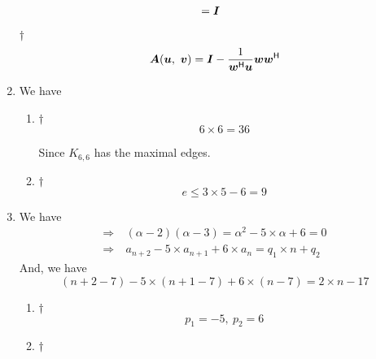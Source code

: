 \documentclass[a4paper,12pt]{article}
\begin{document}
\begin{enumerate}
\begin{equation}
\begin{aligned}
            & = \boldsymbol{I}
        \end{aligned}
    \end{equation}
    \begin{answer}{$\dag$}\begin{equation}
            \boldsymbol{A}(\boldsymbol{u}, \ \boldsymbol{v}) = \boldsymbol{I} - \frac{1}{\boldsymbol{w}^{\mathsf{H}}\boldsymbol{u}}\boldsymbol{w}\boldsymbol{w}^{\mathsf{H}}
        \end{equation}
    \end{answer}
    \item We have \begin{enumerate}[label=(\alph*)]
        \item \begin{answer}{$\dag$}\begin{equation}
                6 \times 6 = 36
            \end{equation}
        \end{answer} Since $K_{6, 6}$ has the maximal edges.
        \item \begin{answer}{$\dag$}\begin{equation}
                e \le 3 \times 5 - 6 = 9
            \end{equation}
        \end{answer}
    \end{enumerate}
    \item We have \begin{equation}
        \begin{aligned}
            \Rightarrow & \ (\alpha - 2)(\alpha - 3) = \alpha^2 - 5 \times \alpha + 6 = 0 \\ 
            \Rightarrow & \ a_{n + 2} - 5 \times a_{n + 1} + 6 \times a_n = q_1 \times n + q_2
        \end{aligned}
    \end{equation} And, we have \begin{equation}
        (n + 2 - 7) - 5 \times (n + 1 - 7) + 6 \times (n - 7) = 2 \times n - 17
    \end{equation}
    \begin{enumerate}[label=(\alph*)]
        \item \begin{answer}{$\dag$}\begin{equation}
                p_1 = -5, \ p_2 = 6
            \end{equation}
        \end{answer}
        \item \begin{answer}{$\dag$}\begin{equation}

\end{equation}
\end{answer}
\end{enumerate}
\end{enumerate}
\end{document}
